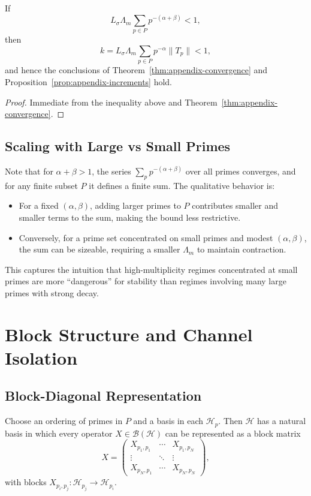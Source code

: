 \documentclass[12pt]{article}
\begin{document}
\begin{corollary}
\label{cor:appendix-explicit-bound}
If
\[
  L_\sigma \Lambda_m \sum_{p\in P} p^{-(\alpha+\beta)} < 1,
\]
then
\[
  k = L_\sigma \Lambda_m \sum_{p\in P} p^{-\alpha} \|T_p\| < 1,
\]
and hence the conclusions of Theorem~\ref{thm:appendix-convergence} and Proposition~\ref{prop:appendix-increments} hold.
\end{corollary}

\begin{proof}
Immediate from the inequality above and Theorem~\ref{thm:appendix-convergence}.
\end{proof}

\subsection{Scaling with Large vs Small Primes}

Note that for \(\alpha+\beta>1\), the series \(\sum_{p} p^{-(\alpha+\beta)}\) over all primes converges, and for any finite subset \(P\) it defines a finite sum. The qualitative behavior is:

\begin{itemize}
  \item For a fixed \((\alpha,\beta)\), adding larger primes to \(P\) contributes smaller and smaller terms to the sum, making the bound less restrictive.
  \item Conversely, for a prime set concentrated on small primes and modest \((\alpha,\beta)\), the sum can be sizeable, requiring a smaller \(\Lambda_m\) to maintain contraction.
\end{itemize}

This captures the intuition that high-multiplicity regimes concentrated at small primes are more ``dangerous'' for stability than regimes involving many large primes with strong decay.

\section{Block Structure and Channel Isolation}
\label{sec:appendix-blocks}

\subsection{Block-Diagonal Representation}

Choose an ordering of primes in \(P\) and a basis in each \(\mathcal{H}_p\). Then \(\mathcal{H}\) has a natural basis in which every operator \(X\in\mathcal{B}(\mathcal{H})\) can be represented as a block matrix
\[
  X = \begin{pmatrix}
    X_{p_1,p_1} & \cdots & X_{p_1,p_N} \\
    \vdots      & \ddots & \vdots      \\
    X_{p_N,p_1} & \cdots & X_{p_N,p_N}
  \end{pmatrix},
\]
with blocks \(X_{p_i,p_j}:\mathcal{H}_{p_j}\to\mathcal{H}_{p_i}\).
\end{document}
